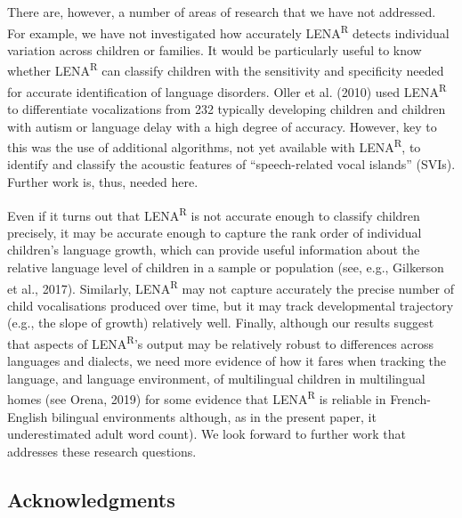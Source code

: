 \documentclass[english,table,man,floatsintext]{apa6}
\begin{document}
There are, however, a number of areas of research that we have not addressed. For example, we have not investigated how accurately LENA\textsuperscript{R} detects individual variation across children or families. It would be particularly useful to know whether LENA\textsuperscript{R} can classify children with the sensitivity and specificity needed for accurate identification of language disorders. Oller et al. (2010) used LENA\textsuperscript{R} to differentiate vocalizations from 232 typically developing children and children with autism or language delay with a high degree of accuracy. However, key to this was the use of additional algorithms, not yet available with LENA\textsuperscript{R}, to identify and classify the acoustic features of \enquote{speech-related vocal islands} (SVIs). Further work is, thus, needed here.

Even if it turns out that LENA\textsuperscript{R} is not accurate enough to classify children precisely, it may be accurate enough to capture the rank order of individual children's language growth, which can provide useful information about the relative language level of children in a sample or population (see, e.g., Gilkerson et al., 2017). Similarly, LENA\textsuperscript{R} may not capture accurately the precise number of child vocalisations produced over time, but it may track developmental trajectory (e.g., the slope of growth) relatively well. Finally, although our results suggest that aspects of LENA\textsuperscript{R}'s output may be relatively robust to differences across languages and dialects, we need more evidence of how it fares when tracking the language, and language environment, of multilingual children in multilingual homes (see Orena, 2019) for some evidence that LENA\textsuperscript{R} is reliable in French-English bilingual environments although, as in the present paper, it underestimated adult word count). We look forward to further work that addresses these research questions.

\hypertarget{acknowledgments}{%
\subsection{Acknowledgments}\label{acknowledgments}}
\end{document}
